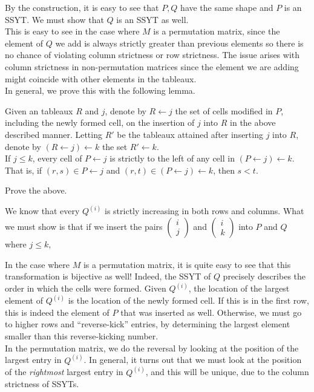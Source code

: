 	By the construction, it is easy to see that $P,Q$ have the same shape and $P$ is an SSYT. We must show that $Q$ is an SSYT as well.\\
	This is easy to see in the case where $M$ is a permutation matrix, since the element of $Q$ we add is always strictly greater than previous elements so there is no chance of violating column strictness or row strictness. The issue arises with column strictness in non-permutation matrices since the element we are adding might coincide with other elements in the tableaux.\\
	In general, we prove this with the following lemma.

	\begin{flem}
		Given an tableaux $R$ and $j$, denote by $R \leftarrow j$ the set of cells modified in $P$, including the newly formed cell, on the insertion of $j$ into $R$ in the above described manner. Letting $R'$ be the tableaux attained after inserting $j$ into $R$, denote by $(R \leftarrow j) \leftarrow k$ the set $R' \leftarrow k$.\\
		If $j \le k$, every cell of $P \leftarrow j$ is strictly to the left of any cell in $(P \leftarrow j) \leftarrow k$. That is, if $(r,s) \in P\leftarrow j$ and $(r,t) \in (P \leftarrow j) \leftarrow k$, then $s < t$.
	\end{flem}

	\begin{exercise}
		Prove the above.
	\end{exercise}

	We know that every $Q^{(i)}$ is strictly increasing in both rows and columns. What we must show is that if we insert the pairs $\begin{pmatrix} i \\ j \end{pmatrix}$ and $\begin{pmatrix} i \\ k \end{pmatrix}$ into $P$ and $Q$ where $j \le k$, 

	In the case where $M$ is a permutation matrix, it is quite easy to see that this transformation is bijective as well! Indeed, the SSYT of $Q$ precisely describes the order in which the cells were formed. Given $Q^{(i)}$, the location of the largest element of $Q^{(i)}$ is the location of the newly formed cell. If this is in the first row, this is indeed the element of $P$ that was inserted as well. Otherwise, we must go to higher rows and ``reverse-kick'' entries, by determining the largest element smaller than this reverse-kicking number.\\
	In the permutation matrix, we do the reversal by looking at the position of the largest entry in $Q^{(i)}$. In general, it turns out that we must look at the position of the \emph{rightmost} largest entry in $Q^{(i)}$, and this will be unique, due to the column strictness of SSYTs.

